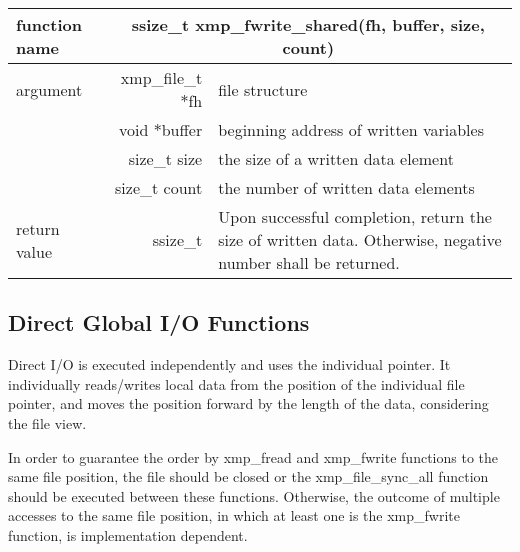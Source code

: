    \begin{table}[h]
    \begin{center}
     \begin{tabular}{|l|r|p{80mm}|}
      \hline
      {\bf function name}  & \multicolumn{2}{c|}{\bf ssize\_t
        xmp\_fwrite\_shared(fh, buffer, size, count)} \\ \hline \hline
      argument & xmp\_file\_t $*$fh & file structure \\ \cline{2-3}
      & void $*$buffer & beginning address of written variables \\ \cline{2-3}
      & size\_t size & the size of a written data element \\ \cline{2-3}
      & size\_t count & the number of written data elements \\ \hline
      return value & ssize\_t & Upon successful completion, return the size
	      of written data. Otherwise, negative number shall be
	      returned. \\ \hline
      \end{tabular}
     \end{center}
   \end{table}


   \subsection{Direct Global I/O Functions}

   Direct I/O is executed independently and uses the individual pointer. 
   It individually reads/writes local data
   from the position of the individual file pointer, and 
   moves the position forward by the length of the data, considering the file view.

   In order to guarantee the order by xmp\_fread and xmp\_fwrite functions to the same file position, the file should be closed or the xmp\_file\_sync\_all function should be executed between these functions. Otherwise, the outcome of multiple accesses to the same file position, in which at least one is the xmp\_fwrite function, is implementation dependent.
   
   
